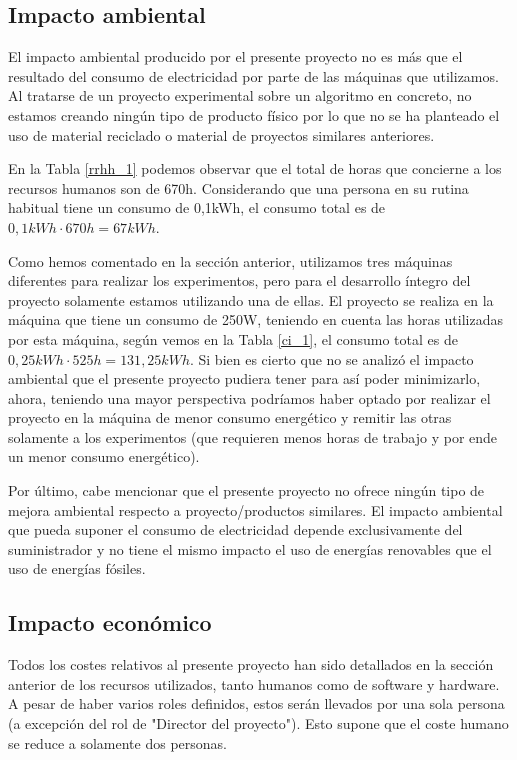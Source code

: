 \documentclass[titlepage,12pt]{report}
\begin{document}
\subsection{Impacto ambiental}

El impacto ambiental producido por el presente proyecto no es más que el resultado del consumo de electricidad por parte de las máquinas que utilizamos. Al tratarse de un proyecto experimental sobre un algoritmo en concreto, no estamos creando ningún tipo de producto físico por lo que no se ha planteado el uso de material reciclado o material de proyectos similares anteriores.

En la Tabla \ref{rrhh_1} podemos observar que el total de horas que concierne a los recursos humanos son de 670h. Considerando que una persona en su rutina habitual tiene un consumo de 0,1kWh, el consumo total es de $0,1kWh \cdot 670h = 67kWh$.

Como hemos comentado en la sección anterior, utilizamos tres máquinas diferentes para realizar los experimentos, pero para el desarrollo íntegro del proyecto solamente estamos utilizando una de ellas. El proyecto se realiza en la máquina que tiene un consumo de 250W, teniendo en cuenta las horas utilizadas por esta máquina, según vemos en la Tabla \ref{ci_1}, el consumo total es de $0,25kWh \cdot 525h = 131,25kWh$. Si bien es cierto que no se analizó el impacto ambiental que el presente proyecto pudiera tener para así poder minimizarlo, ahora, teniendo una mayor perspectiva podríamos haber optado por realizar el proyecto en la máquina de menor consumo energético y remitir las otras solamente a los experimentos (que requieren menos horas de trabajo y por ende un menor consumo energético).

Por último, cabe mencionar que el presente proyecto no ofrece ningún tipo de mejora ambiental respecto a proyecto/productos similares. El impacto ambiental que pueda suponer el consumo de electricidad depende exclusivamente del suministrador y no tiene el mismo impacto el uso de energías renovables que el uso de energías fósiles.

\subsection{Impacto económico}

Todos los costes relativos al presente proyecto han sido detallados en la sección anterior de los recursos utilizados, tanto humanos como de software y hardware. A pesar de haber varios roles definidos, estos serán llevados por una sola persona (a excepción del rol de "Director del proyecto"). Esto supone que el coste humano se reduce a solamente dos personas. 
\end{document}
